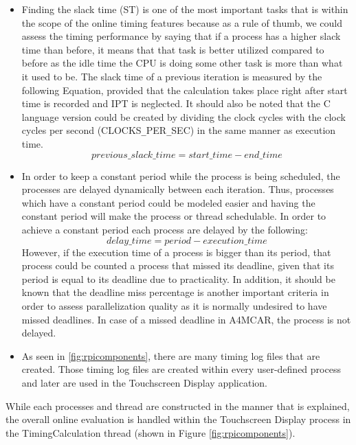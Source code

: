 \begin{itemize}
	\item Finding the slack time (ST) is one of the most important tasks that is within the scope of the online timing features because as a rule of thumb, we could assess the timing performance by saying that if a process has a higher slack time than before, it means that that task is better utilized compared to before as the idle time the CPU is doing some other task is more than what it used to be. The slack time of a previous iteration is measured by the following Equation, provided that the calculation takes place right after start time is recorded and IPT is neglected. It should also be noted that the C language version could be created by dividing the clock cycles with the clock cycles per second (CLOCKS\texttt{\_}PER\texttt{\_}SEC) in the same manner as execution time.
	\begin{equation}
	previous\texttt{\_}slack\texttt{\_}time=start\texttt{\_}time - end\texttt{\_}time
	\end{equation}
	
	\item In order to keep a constant period while the process is being scheduled, the processes are delayed dynamically between each iteration. Thus, processes which have a constant period could be modeled easier and having the constant period will make the process or thread schedulable. In order to achieve a constant period each process are delayed by the following:
	\begin{equation}
	delay\texttt{\_}time=period - execution\texttt{\_}time
	\end{equation}
	However, if the execution time of a process is bigger than its period, that process could be counted a process that missed its deadline, given that its period is equal to its deadline due to practicality. In addition, it should be known that the deadline miss percentage is another important criteria in order to assess parallelization quality as it is normally undesired to have missed deadlines. In case of a missed deadline in A4MCAR, the process is not delayed.
	
	\item As seen in \ref{fig:rpicomponents}, there are many timing log files that are created. Those timing log files are created within every user-defined process and later are used in the Touchscreen Display application.
\end{itemize}

While each processes and thread are constructed in the manner that is explained, the overall online evaluation is handled within the Touchscreen Display process in the TimingCalculation thread (shown in Figure \ref{fig:rpicomponents}).

